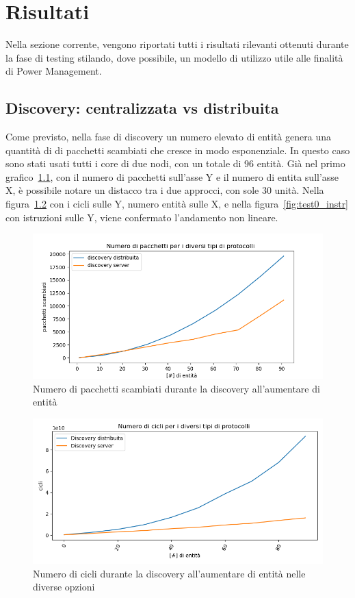 \chapter{Risultati}%

Nella sezione corrente, vengono riportati tutti i risultati rilevanti ottenuti durante la fase di testing stilando, dove possibile, un modello di utilizzo utile alle finalità di Power Management.
\section{Discovery: centralizzata vs distribuita}
Come previsto, nella fase di discovery un numero elevato di entità genera una quantità di di pacchetti scambiati che cresce in modo esponenziale. In questo caso sono stati usati tutti i core di due nodi, con un totale di 96 entità.
Già nel primo grafico~\ref{fig:test0pack}, con il numero di pacchetti sull'asse Y e il numero di entita sull'asse X, è possibile notare un distacco tra i due approcci, con sole 30 unità. Nella figura~\ref{fig:test0cicl} con i cicli sulle Y, numero entità sulle X, e nella figura~\ref{fig:test0_instr} con istruzioni sulle Y, viene confermato l'andamento non lineare.
\begin{figure}[H]
    \includegraphics[width=\textwidth]{./results/test0_packet.png} 
    \caption{Numero di pacchetti scambiati durante la discovery all'aumentare di entità}\label{fig:test0pack}
\end{figure}
\begin{figure}[H]
    \includegraphics[width=\textwidth]{./results/test0_cicli.png} 
    \caption{Numero di cicli durante la discovery all'aumentare di entità nelle diverse opzioni}\label{fig:test0cicl}
\end{figure}
